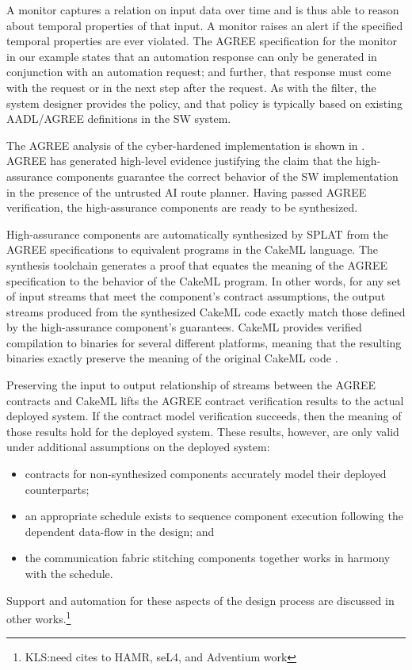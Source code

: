 A monitor captures a relation on input data over time and is thus able
to reason about temporal properties of that input.  A monitor raises
an alert if the specified temporal properties are ever violated.  The
AGREE specification for the monitor in our example states that an
automation response can only be generated in conjunction with an
automation request; and further, that response must come with the
request or in the next step after the request.  As with the filter,
the system designer provides the policy, and that policy is typically
based on existing AADL/AGREE definitions in the SW system.

The AGREE analysis of the cyber-hardened implementation is shown in
. AGREE has generated high-level
evidence justifying the claim that the high-assurance components
guarantee the correct behavior of the SW implementation in the
presence of the untrusted AI route planner.  Having passed AGREE
verification, the high-assurance components are ready to be
synthesized.

High-assurance components are automatically synthesized by SPLAT from
the AGREE specifications to equivalent programs in the CakeML
language.  The synthesis toolchain generates a proof that equates the
meaning of the AGREE specification to the behavior of the CakeML
program.  In other words, for any set of input streams that meet the
component's contract assumptions, the output streams produced from the
synthesized CakeML code exactly match those defined by the
high-assurance component's guarantees.  CakeML provides verified
compilation to binaries for several different platforms, meaning that
the resulting binaries exactly preserve the meaning of the original
CakeML code \cite{cakeml}.

Preserving the input to output relationship of streams between the
AGREE contracts and CakeML lifts the AGREE contract verification
results to the actual deployed system.  If the contract model
verification succeeds, then the meaning of those results hold for the
deployed system.  These results, however, are only valid under
additional assumptions on the deployed system:
\begin{itemize}
\item contracts for non-synthesized components accurately model their deployed
counterparts;
\item an appropriate schedule exists to sequence component
  execution following the dependent data-flow in the design; and
\item the communication fabric stitching components together works in harmony
  with the schedule.
\end{itemize}
\noindent Support and automation for these aspects of the design process are
discussed in other works.\footnote{KLS:need cites to HAMR, seL4, and Adventium work}
